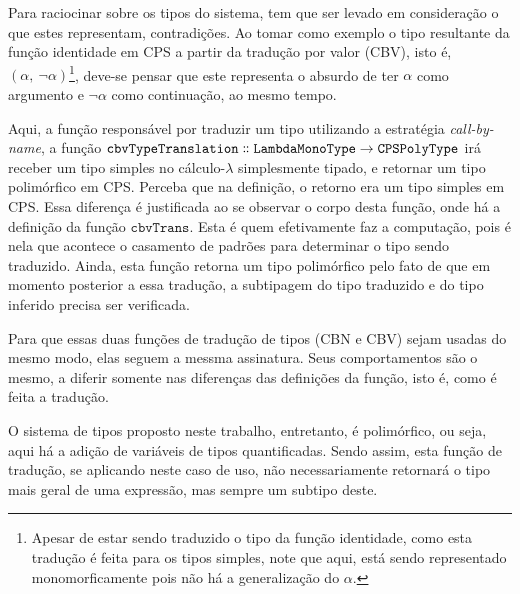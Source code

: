 Para raciocinar sobre os tipos do sistema, tem que ser levado em consideração o que estes representam, contradições.
Ao tomar como exemplo o tipo resultante da função identidade em CPS a partir da tradução por valor (CBV), isto é, $(\alpha,\ \neg\alpha)$\footnote{Apesar de estar sendo traduzido o tipo da função identidade, como esta tradução é feita para os tipos simples, note que aqui, está sendo representado monomorficamente pois não há a generalização do $\alpha$.}, deve-se pensar que este representa o absurdo de ter $\alpha$ como argumento e $\neg\alpha$ como continuação, ao mesmo tempo.


Aqui, a função responsável por traduzir um tipo utilizando a estratégia \textit{call-by-name}, a função $\mathtt{cbvTypeTranslation \dblcolon LambdaMonoType \to CPSPolyType}$ irá receber um tipo simples no cálculo-$\lambda$ simplesmente tipado, e retornar um tipo polimórfico em CPS.
Perceba que na definição, o retorno era um tipo simples em CPS. 
Essa diferença é justificada ao se observar o corpo desta função, onde há a definição da função $\mathtt{cbvTrans}$.
Esta é quem efetivamente faz a computação, pois é nela que acontece o casamento de padrões para determinar o tipo sendo traduzido.
Ainda, esta função retorna um tipo polimórfico pelo fato de que em momento posterior a essa tradução, a subtipagem do tipo traduzido e do tipo inferido precisa ser verificada.


Para que essas duas funções de tradução de tipos (CBN e CBV) sejam usadas do mesmo modo, elas seguem a messma assinatura. 
Seus comportamentos são o mesmo, a diferir somente nas diferenças das definições da função, isto é, como é feita a tradução.

O sistema de tipos proposto neste trabalho, entretanto, é polimórfico, ou seja, aqui há a adição de variáveis de tipos quantificadas.
Sendo assim, esta função de tradução, se aplicando neste caso de uso, não necessariamente retornará o tipo mais geral de uma expressão, mas sempre um subtipo deste.
